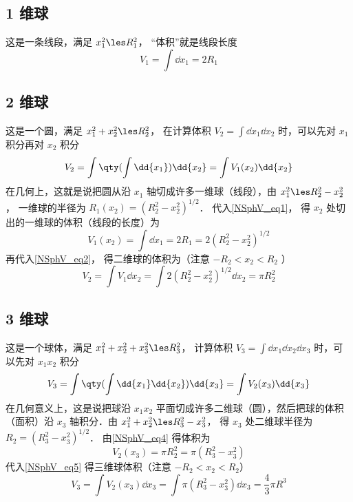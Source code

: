 \subsection{1 维球}
这是一条线段，满足 $x_1^2 \les R_1^2$， “体积”就是线段长度
\begin{equation}\label{NSphV_eq1}
V_1 = \int \dd{x_1} = 2 R_1
\end{equation}
\subsection{ 2 维球}
这是一个圆，满足 $x_1^2 + x_2^2 \les R_2^2$， 在计算体积 $V_2 = \int \dd{x_1}\dd{x_2}$ 时，可以先对 $x_1$ 积分再对 $x_2$ 积分
\begin{equation}\label{NSphV_eq2}
V_2 = \int \qty(\int \dd{x_1}) \dd{x_2}  = \int V_1(x_2) \dd{x_2}
\end{equation}
在几何上，这就是说把圆从沿 $x_1$ 轴切成许多一维球（线段），由 $x_1^2 \les R_2^2 - x_2^2$， 一维球的半径为 $R_1(x_2) = (R_2^2 - x_2^2)^{1/2}$． 代入\autoref{NSphV_eq1}， 得 $x_2$ 处切出的一维球的体积（线段的长度）为
\begin{equation}\label{NSphV_eq3}
V_1 (x_2) = \int \dd{x_1} = 2R_1 = 2(R_2^2 - x_2^2)^{1/2}
\end{equation}
再代入\autoref{NSphV_eq2}， 得二维球的体积为（注意 $ -R_2 < x_2 < R_2$ ）
\begin{equation}\label{NSphV_eq4}
V_2 = \int V_1 \dd{x_2} = \int 2 (R_2^2 - x_2^2)^{1/2} \dd{x_2}  = \pi R_2^2
\end{equation}
\subsection{ 3 维球}
这是一个球体，满足 $x_1^2 + x_2^2 + x_3^2 \les R_3^2$， 计算体积 $V_3 = \int \dd{x_1}\dd{x_2} \dd{x_3}$ 时，可以先对 $x_1 x_2$ 积分
\begin{equation}\label{NSphV_eq5}
V_3 = \int \qty(\int \dd{x_1} \dd{x_2}) \dd{x_3} = \int V_2(x_3) \dd{x_3}
\end{equation}
在几何意义上，这是说把球沿 $x_1 x_2$ 平面切成许多二维球（圆），然后把球的体积（面积）沿 $x_3$ 轴积分．由 $x_1^2 + x_2^2 \les R_3^2 - x_3^2$， 得 $x_3$ 处二维球半径为 $R_2 = (R_3^2 - x_3^2)^{1/2}$． 由\autoref{NSphV_eq4} 得体积为
\begin{equation}\label{NSphV_eq6}
V_2 (x_3) = \pi R_2^2 = \pi (R_3^2 - x_3^2)
\end{equation}
代入\autoref{NSphV_eq5} 得三维球体积（注意 $-R_2 < x_2 < R_2$）
\begin{equation}\label{NSphV_eq7}
V_3 = \int V_2(x_3) \dd{x_3} = \int \pi (R_3^2 - x_3^2)\dd{x_3}  = \frac43 \pi R^3
\end{equation}
